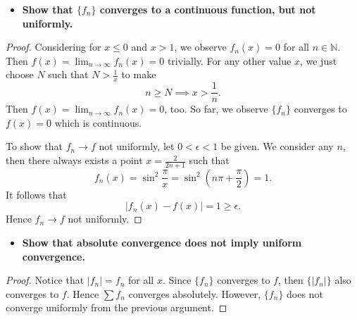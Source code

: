 \begin{Exercise}
	\begin{itemize}
		\item \textbf{Show that $\{f_n\}$ converges to a continuous function, but not uniformly.}
	\end{itemize}
	\begin{proof}
		Considering for $x\leq 0$ and $x > 1$, we observe $f_n(x) = 0$ for all $n\in\mathbb{N}$.
		Then $f(x) = \lim_{n\to\infty}f_n(x) = 0$ trivially.
		For any other value $x$, we just choose $N$ such that $N>\frac{1}{x}$ to make 
		$$
		n\geq N \implies x > \frac{1}{n}.
		$$
		Then $f(x) = \lim_{n\to\infty}f_n(x) = 0$, too.
		So far, we observe $\{f_n\}$ converges to $f(x) = 0$ which is continuous.
		
		To show that $f_n\to f$ not uniformly, let $0<\epsilon<1$ be given.
		We consider any $n$, then there always exists a point $x = \frac{2}{2n+1}$ such that
		$$
		f_n(x) 
		= \sin^2 \frac{\pi}{x} 
		= \sin^2 \left(n\pi + \frac{\pi}{2} \right)
		= 1.
		$$
		It follows that
		$$
		|f_n(x) - f(x)| = 1 \geq \epsilon.
		$$
		Hence $f_n\to f$ not uniformly.
	\end{proof}
	
	\begin{itemize}
		\item \textbf{Show that absolute convergence does not imply uniform convergence.}
	\end{itemize}
	\begin{proof}
		Notice that $|f_n| = f_n$ for all $x$.
		Since $\{f_n\}$ converges to $f$, then $\{|f_n|\}$ also converges to $f$.
		Hence $\sum f_n$ converges absolutely.
		However, $\{f_n\}$ does not converge uniformly from the previous argument.
	\end{proof}
\end{Exercise}